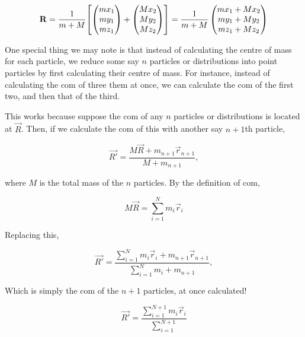 \begin{equation*}
    \mathbf{R} = \frac{1}{m+M}\qty[\begin{pmatrix} mx_1 \\ my_1 \\ mz_1\end{pmatrix} + \begin{pmatrix} Mx_2 \\ My_2 \\ Mz_2\end{pmatrix}]
    = \frac{1}{m + M}\begin{pmatrix} mx_1 + Mx_2 \\ my_1 + My_2 \\ mz_1 + Mz_2\end{pmatrix}
\end{equation*}

One special thing we may note is that instead of calculating the centre of mass 
for each particle, we reduce some say \(n\) particles or distributions into 
point particles by first calculating their centre of mass. For instance,
instead of calculating the com of three them at once, we 
can calculate the com of the first two, and then that of the third.

This works because suppose the com of any \(n\) particles or distributions is located at 
\(\Vec{R}\). Then, if we calculate the com of this with another say \(n+1\)th particle, 

\begin{equation*}
    \Vec{R'} = \frac{M\Vec{R} + m_{n+1}\vec{r}_{n+1}}{M + m_{n+1}},
\end{equation*}

where \(M\) is the total mass of the \(n\) particles. By the definition of com, 

\begin{equation*}
    M\Vec{R} = \sum^N_{i=1} m_i\vec{r}_i
\end{equation*}

Replacing this, 

\begin{equation*}
    \Vec{R'} = \frac{\sum^N_{i=1} m_i\vec{r}_i + m_{n+1}\vec{r}_{n+1}}{\sum_{i=1}^N m_i + m_{n+1}},
\end{equation*}

Which is simply the com of the \(n+1\) particles, at once calculated!

\begin{equation*}
    \Vec{R'} = \frac{\sum^{N+1}_{i=1} m_i\vec{r}_i}{\sum_{i=1}^{N+1}}
\end{equation*}

